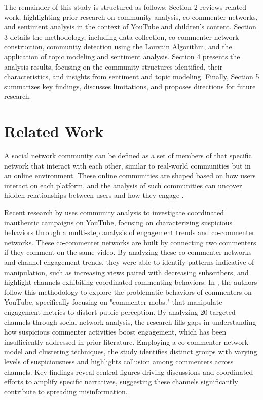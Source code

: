 \documentclass[sigconf]{acmart}
\begin{document}
The remainder of this study is structured as follows. Section 2 reviews related work, highlighting 
prior research on community analysis, co-commenter networks, and sentiment analysis in the context 
of YouTube and children's content. Section 3 details the methodology, including data collection, 
co-commenter network construction, community detection using the Louvain Algorithm, and the application 
of topic modeling and sentiment analysis. Section 4 presents the analysis results, focusing 
on the community structures identified, their characteristics, and insights from sentiment and topic 
modeling. Finally, Section 5 summarizes key findings, discusses limitations, and proposes directions for 
future research.

\section{Related Work}

A social network community can be defined as a set of members of that specific network that interact
with each other, similar to real-world communities but in an online environment.
These online communities are shaped based on how users interact on each platform, and the analysis of such communities can uncover hidden relationships between users and how they engage \cite{nooribakhsh2024community}.

Recent research by \cite{kirdemir2023} uses community analysis to investigate coordinated 
inauthentic campaigns on YouTube, focusing on characterizing suspicious behaviors through a 
multi-step analysis of engagement trends and co-commenter networks. These co-commenter networks are
built by connecting two commenters if they comment on the same video.
By analyzing these co-commenter networks and channel engagement trends, they were able to identify
patterns indicative of manipulation, such as increasing views paired with decreasing subscribers, 
and highlight channels exhibiting coordinated 
commenting behaviors. In \cite{shajari2023}, the authors follow this methodology to
explore the problematic behaviors of commenters on YouTube, specifically focusing on "commenter mobs." 
that manipulate engagement metrics to distort public perception. 
By analyzing 20 targeted channels through social network analysis, the research fills gaps in 
understanding how suspicious commenter activities boost engagement, which has been insufficiently 
addressed in prior literature. Employing a co-commenter network model and clustering techniques, 
the study identifies distinct groups with varying levels of suspiciousness and highlights collusion 
among commenters across channels. Key findings reveal central figures driving discussions and 
coordinated efforts to amplify specific narratives, suggesting these channels significantly contribute 
to spreading misinformation. 
\end{document}

